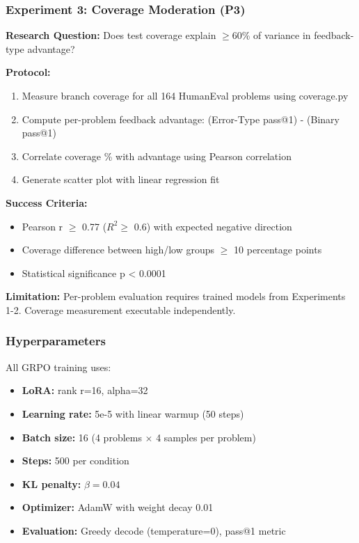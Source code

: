 \subsubsection{Experiment 3: Coverage Moderation (P3)}

\textbf{Research Question:} Does test coverage explain $\geq 60$\% of variance in feedback-type advantage?

\textbf{Protocol:}
\begin{enumerate}
\item Measure branch coverage for all 164 HumanEval problems using coverage.py
\item Compute per-problem feedback advantage: (Error-Type pass@1) - (Binary pass@1)
\item Correlate coverage \% with advantage using Pearson correlation
\item Generate scatter plot with linear regression fit
\end{enumerate}

\textbf{Success Criteria:}
\begin{itemize}
\item Pearson r $\geq$ 0.77 ($R^2 \geq$ 0.6) with expected negative direction
\item Coverage difference between high/low groups $\geq$ 10 percentage points
\item Statistical significance p < 0.0001
\end{itemize}

\textbf{Limitation:} Per-problem evaluation requires trained models from Experiments 1-2. Coverage measurement executable independently.

\subsubsection{Hyperparameters}

All GRPO training uses:
\begin{itemize}
\item \textbf{LoRA:} rank r=16, alpha=32
\item \textbf{Learning rate:} 5e-5 with linear warmup (50 steps)
\item \textbf{Batch size:} 16 (4 problems $\times$ 4 samples per problem)
\item \textbf{Steps:} 500 per condition
\item \textbf{KL penalty:} $\beta =0.04$
\item \textbf{Optimizer:} AdamW with weight decay 0.01
\item \textbf{Evaluation:} Greedy decode (temperature=0), pass@1 metric
\end{itemize}

